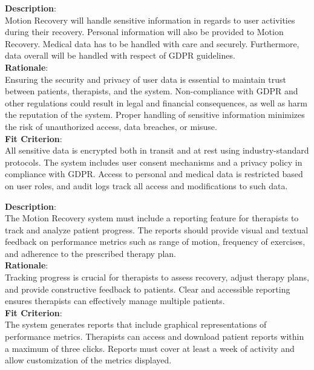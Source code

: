 \begin{tcolorbox}[minimalcard]
    \raggedright\textbf{Description}: \vspace{6pt}\\
    Motion Recovery will handle sensitive information in regards to user activities during their recovery. Personal information will also be provided to Motion Recovery. Medical data has to be handled with care and securely. Furthermore, data overall will be handled with respect of GDPR guidelines.\\
    \vspace{6pt}
    \textbf{Rationale}:\\ \vspace{6pt}
    Ensuring the security and privacy of user data is essential to maintain trust between patients, therapists, and the system. Non-compliance with GDPR and other regulations could result in legal and financial consequences, as well as harm the reputation of the system. Proper handling of sensitive information minimizes the risk of unauthorized access, data breaches, or misuse.\\
    \vspace{6pt}
    \textbf{Fit Criterion}:\\ \vspace{6pt}
    All sensitive data is encrypted both in transit and at rest using industry-standard protocols. The system includes user consent mechanisms and a privacy policy in compliance with GDPR. Access to personal and medical data is restricted based on user roles, and audit logs track all access and modifications to such data.
\end{tcolorbox}
\vfill
\hfill
\begin{tcolorbox}[minimalcard]
    \raggedright\textbf{Description}: \vspace{6pt}\\
    The Motion Recovery system must include a reporting feature for therapists to track and analyze patient progress. The reports should provide visual and textual feedback on performance metrics such as range of motion, frequency of exercises, and adherence to the prescribed therapy plan.\\
    \vspace{6pt}
    \textbf{Rationale}: \vspace{6pt}\\
    Tracking progress is crucial for therapists to assess recovery, adjust therapy plans, and provide constructive feedback to patients. Clear and accessible reporting ensures therapists can effectively manage multiple patients.\\
    \vspace{6pt}
    \textbf{Fit Criterion}: \vspace{6pt}\\
    The system generates reports that include graphical representations of performance metrics. Therapists can access and download patient reports within a maximum of three clicks. Reports must cover at least a week of activity and allow customization of the metrics displayed.
\end{tcolorbox}

